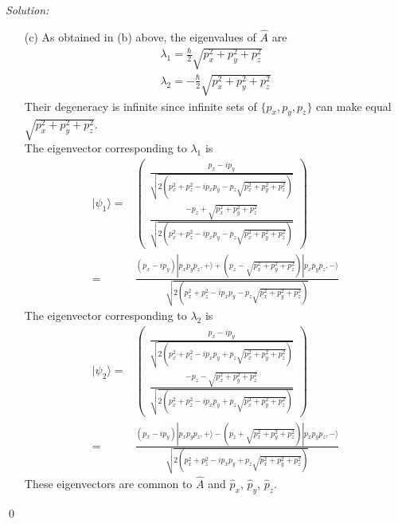 \documentclass[10pt,a4paper]{article}
\newenvironment{sol}
    {\emph{Solution:}
    }
    {
    \qed
    }
\begin{document}
\begin{sol}
\begin{itemize}
\item[(c)] As obtained in (b) above, the eigenvalues of $\hat{A}$ are
\begin{gather}
\lambda_1=\frac{\hbar}{2}\sqrt{p_x^2+p_y^2+p_z^2}\\
\lambda_2=-\frac{\hbar}{2}\sqrt{p_x^2+p_y^2+p_z^2}
\end{gather}
Their degeneracy is infinite since infinite sets of $\{p_x,p_y,p_z\}$ can make equal $\sqrt{p_x^2+p_y^2+p_z^2}$.\\
The eigenvector corresponding to $\lambda_1$ is
\begin{align}
\nonumber|\psi_1\rangle=&\left(\begin{array}{c}
\frac{p_x-ip_y}{\sqrt{2(p_x^2+p_z^2-ip_xp_y-p_z\sqrt{p_x^2+p_y^2+p_z^2})}}\\
\frac{-p_z+\sqrt{p_x^2+p_y^2+p_z^2}}{\sqrt{2(p_x^2+p_z^2-ip_xp_y-p_z\sqrt{p_x^2+p_y^2+p_z^2})}}
\end{array}\right)\\
=&\frac{(p_x-ip_y)|p_xp_yp_z,+\rangle+(p_z-\sqrt{p_x^2+p_y^2+p_z^2})|p_xp_yp_z,-\rangle}{\sqrt{2(p_x^2+p_z^2-ip_xp_y-p_z\sqrt{p_x^2+p_y^2+p_z^2})}}
\end{align}
The eigenvector corresponding to $\lambda_2$ is
\begin{align}
\nonumber|\psi_2\rangle=&\left(\begin{array}{c}
\frac{p_x-ip_y}{\sqrt{2(p_x^2+p_z^2-ip_xp_y+p_z\sqrt{p_x^2+p_y^2+p_z^2})}}\\
\frac{-p_z-\sqrt{p_x^2+p_y^2+p_z^2}}{\sqrt{2(p_x^2+p_z^2-ip_xp_y+p_z\sqrt{p_x^2+p_y^2+p_z^2})}}
\end{array}\right)\\
=&\frac{(p_x-ip_y)|p_xp_yp_z,+\rangle-(p_z+\sqrt{p_x^2+p_y^2+p_z^2})|p_xp_yp_z,-\rangle}{\sqrt{2(p_x^2+p_z^2-ip_xp_y+p_z\sqrt{p_x^2+p_y^2+p_z^2})}}
\end{align}
These eigenvectors are common to $\hat{A}$ and $\hat{p}_x$, $\hat{p}_y$, $\hat{p}_z$.
\end{itemize}
\end{sol}
\end{document}
